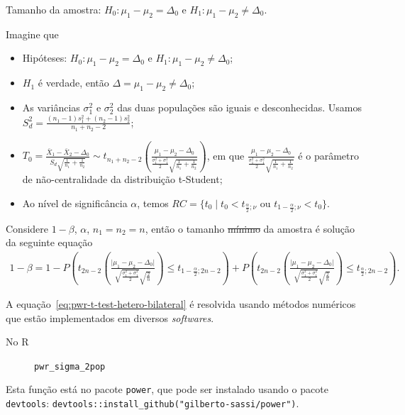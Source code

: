 \documentclass[9pt]{beamer}
\begin{document}
\begin{frame}[fragile]{Tamanho da amostra: $H_0:\mu_1 - \mu_2 = \Delta_0$ e $H_1: \mu_1 - \mu_2 \neq \Delta_0$.}

\footnotesize

Imagine que
\begin{itemize}
\item Hipóteses: $H_0: \mu_1 - \mu_2 = \Delta_0$ e $H_1: \mu_1 -  \mu_2 \neq \Delta_0$;
\item $H_1$ é verdade, então $\Delta = \mu_1-\mu_2 \neq \Delta_0$;
\item As variâncias $\sigma_1^2$  e $\sigma_2^2$ das duas populações são iguais e desconhecidas. Usamos $S_d^2 = \frac{(n_1-1)s_1^2 + (n_2-1)s_2^2}{n_1+n_2-2}$;
\item $T_0 = \frac{\bar{X}_1 - \bar{X}_2 - \Delta_0}{ S_d \sqrt{ \frac{1}{n_1} + \frac{1}{n_2} } } \sim t_{n_1+n_2-2}\left( \frac{\mu_1 - \mu_2 - \Delta_0}{\frac{\sigma_1^2 + \sigma_1^2}{2} \sqrt{\frac{1}{n_1} + \frac{1}{n_2}}} \right)$, em que $\frac{\mu_1 - \mu_2 - \Delta_0}{\frac{\sigma_1^2 + \sigma_1^2}{2} \sqrt{\frac{1}{n_1} + \frac{1}{n_2}}}$ é o parâmetro de não-centralidade da distribuição t-Student;
\item Ao nível de significância $\alpha$, temos $RC = \{ t_0 \mid t_0 < t_{\frac{\alpha}{2};\nu} \mbox{ ou } t_{1-\frac{\alpha}{2};\nu} < t_0  \}$.
\end{itemize}
\vfill

Considere $1-\beta$, $\alpha$, $n_1=n_2=n$, então o tamanho \sout{mínimo} da amostra é solução da seguinte equação
\scriptsize
\begin{align}\label{eq:pwr-t-test-hetero-bilateral}
1-\beta = 1 - P\left( t_{2n-2}\left( \frac{\lvert \mu_1 - \mu_2 - \Delta_0 \rvert}{\sqrt{\frac{\sigma_1^2 + \sigma_1^2}{2}} \sqrt{\frac{2}{n}}} \right) \leq t_{1-\frac{\alpha}{2};2n-2} \right)+P\left( t_{2n-2}\left( \frac{\lvert \mu_1 - \mu_2 - \Delta_0\rvert}{\sqrt{\frac{\sigma_1^2 + \sigma_1^2}{2}} \sqrt{\frac{2}{n}}} \right) \leq t_{\frac{\alpha}{2};2n-2} \right).
\end{align}

A equação~\eqref{eq:pwr-t-test-hetero-bilateral} é resolvida usando métodos numéricos que estão implementados em diversos \textit{softwares}.
\begin{description}
	\item[No R] \lstinline|pwr_sigma_2pop|
\end{description}
Esta função está no pacote \lstinline|power|, que pode ser instalado usando o pacote \lstinline|devtools|: \lstinline|devtools::install_github("gilberto-sassi/power")|.

\normalsize
\end{frame}
\end{document}
